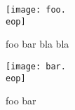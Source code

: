 \begin{figure}
  \texttt{[image: foo.\\eop]}

  \caption{foo bar bla bla}

\end{figure}

\begin{figure}
  \texttt{[image: bar.\\eop]}

  \caption{foo bar}

\end{figure}




